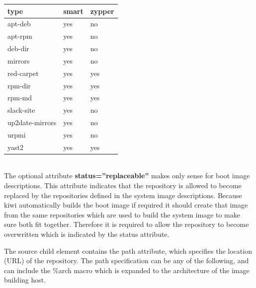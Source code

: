 \begin{tabular}[h]{|p{4cm}|p{2cm}|p{2cm}|}
\hline
\textbf{type} & \textbf{smart} & \textbf{zypper} \\
\hline
apt-deb            & yes & no  \\
apt-rpm            & yes & no  \\
deb-dir            & yes & no  \\
mirrors            & yes & no  \\
red-carpet         & yes & yes \\
rpm-dir            & yes & yes \\
rpm-md             & yes & yes \\ 
slack-site         & yes & no  \\
up2date-mirrors    & yes & no  \\
urpmi              & yes & no  \\
yast2              & yes & yes \\
\hline
\end{tabular}\\

The optional attribute \textbf{status=''replaceable''} makes only
sense for boot image descriptions. This attribute indicates that
the repository is allowed to become replaced by the repositories
defined in the system image descriptions. Because kiwi automatically
builds the boot image if required it should create that image from
the same repositories which are used to build the system image to
make sure both fit together. Therefore it is required to allow the
repository to become overwritten which is indicated by the status
attribute.

The source child element contains the path attribute, which specifies
the location (URL) of the repository. The path specification can be any
of the following, and can include the \%arch macro which is expanded
to the architecture of the image building host.

